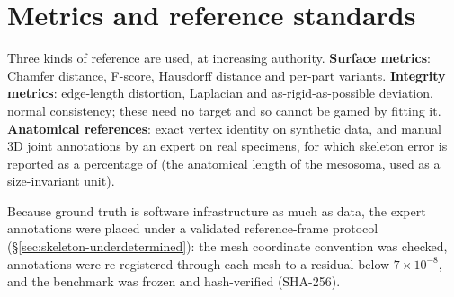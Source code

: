 \section{Metrics and reference standards}

Three kinds of reference are used, at increasing authority. \textbf{Surface
metrics}: Chamfer distance, F-score, Hausdorff distance and per-part
variants. \textbf{Integrity metrics}: edge-length distortion, Laplacian and
as-rigid-as-possible deviation, normal consistency; these need no target and
so cannot be gamed by fitting it. \textbf{Anatomical references}: exact
vertex identity on synthetic data, and manual 3D joint annotations by an
expert on real specimens, for which skeleton error is reported as a
percentage of  (the anatomical length of the mesosoma,
used as a size-invariant unit).

Because ground truth is software infrastructure as much as data, the
expert annotations were placed under a validated reference-frame protocol
(\S\ref{sec:skeleton-underdetermined}): the mesh coordinate convention was
checked, annotations were re-registered through each mesh to a residual below
$7\times10^{-8}$, and the benchmark was frozen and hash-verified (SHA-256).
